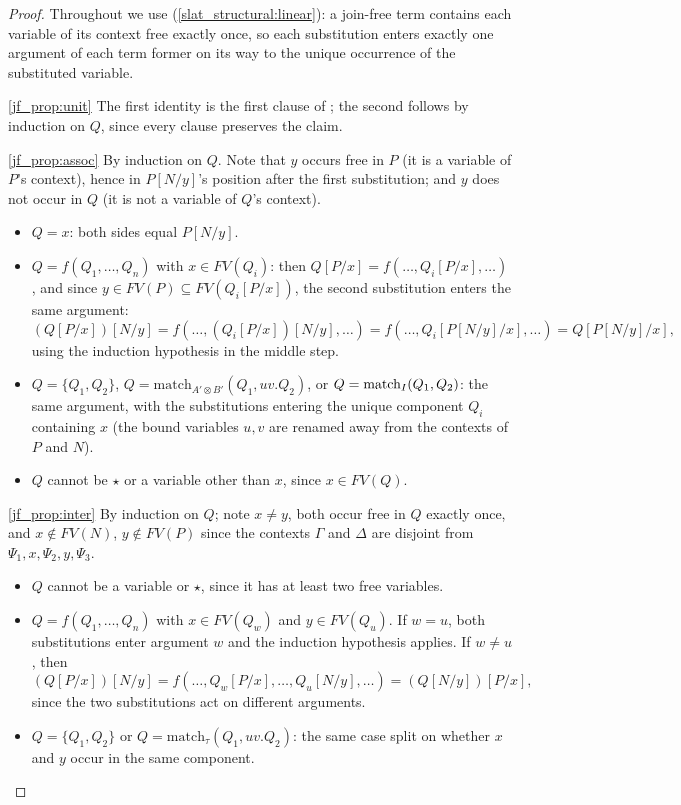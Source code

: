 \begin{proof}
Throughout we use (\ref{slat_structural:linear}): a join-free term contains each variable of its context free exactly once, so each substitution enters exactly one argument of each term former on its way to the unique occurrence of the substituted variable.

\ref{jf_prop:unit} The first identity is the first clause of ; the second follows by induction on $Q$, since every clause preserves the claim.

\ref{jf_prop:assoc} By induction on $Q$.
Note that $y$ occurs free in $P$ (it is a variable of $P$'s context), hence in $P[N/y]$'s position after the first substitution; and $y$ does not occur in $Q$ (it is not a variable of $Q$'s context).
\begin{itemize}
  \item $Q = x$: both sides equal $P[N/y]$.
  \item $Q = f(Q_1, \ldots, Q_n)$ with $x \in FV(Q_i)$: then $Q[P/x] = f(\ldots, Q_i[P/x], \ldots)$, and since $y \in FV(P) \subseteq FV(Q_i[P/x])$, the second substitution enters the same argument:
  \[
  (Q[P/x])[N/y] = f(\ldots, (Q_i[P/x])[N/y], \ldots) = f(\ldots, Q_i[P[N/y]/x], \ldots) = Q[P[N/y]/x],
  \]
  using the induction hypothesis in the middle step.
  \item $Q = \{Q_1, Q_2\}$, $Q = \text{match}_{A' \otimes B'}(Q_1, uv.Q_2)$, or $Q = \text{match}_{I}(Q_1, Q_2)$: the same argument, with the substitutions entering the unique component $Q_i$ containing $x$ (the bound variables $u, v$ are renamed away from the contexts of $P$ and $N$).
  \item $Q$ cannot be $\star$ or a variable other than $x$, since $x \in FV(Q)$.
\end{itemize}

\ref{jf_prop:inter} By induction on $Q$; note $x \neq y$, both occur free in $Q$ exactly once, and $x \notin FV(N)$, $y \notin FV(P)$ since the contexts $\Gamma$ and $\Delta$ are disjoint from $\Psi_1, x, \Psi_2, y, \Psi_3$.
\begin{itemize}
  \item $Q$ cannot be a variable or $\star$, since it has at least two free variables.
  \item $Q = f(Q_1, \ldots, Q_n)$ with $x \in FV(Q_w)$ and $y \in FV(Q_u)$.
  If $w = u$, both substitutions enter argument $w$ and the induction hypothesis applies.
  If $w \neq u$, then
  \[
  (Q[P/x])[N/y] = f(\ldots, Q_w[P/x], \ldots, Q_u[N/y], \ldots) = (Q[N/y])[P/x],
  \]
  since the two substitutions act on different arguments.
  \item $Q = \{Q_1, Q_2\}$ or $Q = \text{match}_{\tau}(Q_1, uv.Q_2)$: the same case split on whether $x$ and $y$ occur in the same component.
\end{itemize}
\end{proof}

